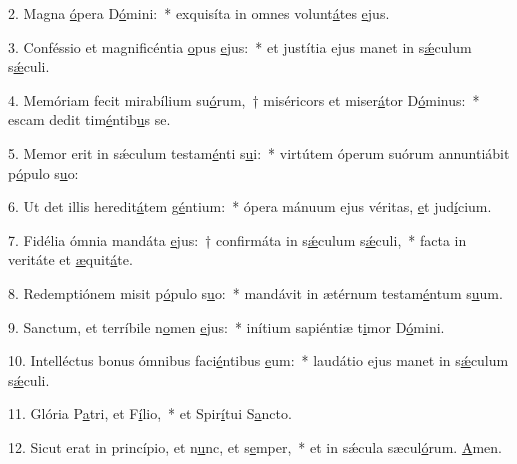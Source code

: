 2. Magna \uline{ó}pera D\uline{ó}mini:~* exquisíta in omnes volunt\uline{á}tes \uline{e}jus.\par 
3. Conféssio et magnificéntia \uline{o}pus \uline{e}jus:~* et justítia ejus manet in s\uline{ǽ}culum s\uline{ǽ}culi.\par 
4. Memóriam fecit mirabílium su\uline{ó}rum,~† miséricors et miser\uline{á}tor D\uline{ó}minus:~* escam dedit tim\uline{é}ntib\uline{u}s se.\par 
5. Memor erit in sǽculum testam\uline{é}nti s\uline{u}i:~* virtútem óperum suórum annuntiábit p\uline{ó}pulo s\uline{u}o:\par 
6. Ut det illis heredit\uline{á}tem g\uline{é}ntium:~* ópera mánuum ejus véritas, \uline{e}t jud\uline{í}cium.\par 
7. Fidélia ómnia mandáta \uline{e}jus:~† confirmáta in s\uline{ǽ}culum s\uline{ǽ}culi,~* facta in veritáte et \uline{æ}quit\uline{á}te.\par 
8. Redemptiónem misit p\uline{ó}pulo s\uline{u}o:~* mandávit in ætérnum testam\uline{é}ntum s\uline{u}um.\par 
9. Sanctum, et terríbile n\uline{o}men \uline{e}jus:~* inítium sapiéntiæ t\uline{i}mor D\uline{ó}mini.\par 
10. Intelléctus bonus ómnibus faci\uline{é}ntibus \uline{e}um:~* laudátio ejus manet in s\uline{ǽ}culum s\uline{ǽ}culi.\par 
11. Glória P\uline{a}tri, et F\uline{í}lio,~* et Spir\uline{í}tui S\uline{a}ncto.\par 
12. Sicut erat in princípio, et n\uline{u}nc, et s\uline{e}mper,~* et in sǽcula sæcul\uline{ó}rum. \uline{A}men.\par 
